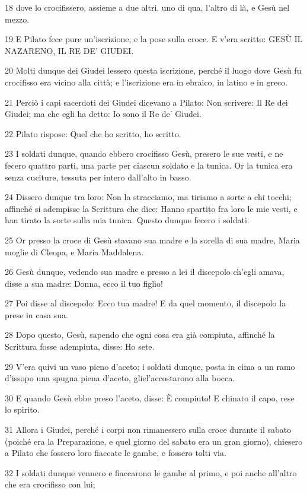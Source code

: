 \par 18 dove lo crocifissero, assieme a due altri, uno di qua, l'altro di là, e Gesù nel mezzo.
\par 19 E Pilato fece pure un'iscrizione, e la pose sulla croce. E v'era scritto: GESÙ IL NAZARENO, IL RE DE' GIUDEI.
\par 20 Molti dunque dei Giudei lessero questa iscrizione, perché il luogo dove Gesù fu crocifisso era vicino alla città; e l'iscrizione era in ebraico, in latino e in greco.
\par 21 Perciò i capi sacerdoti dei Giudei dicevano a Pilato: Non scrivere: Il Re dei Giudei; ma che egli ha detto: Io sono il Re de' Giudei.
\par 22 Pilato rispose: Quel che ho scritto, ho scritto.
\par 23 I soldati dunque, quando ebbero crocifisso Gesù, presero le sue vesti, e ne fecero quattro parti, una parte per ciascun soldato e la tunica. Or la tunica era senza cuciture, tessuta per intero dall'alto in basso.
\par 24 Dissero dunque tra loro: Non la stracciamo, ma tiriamo a sorte a chi tocchi; affinché si adempisse la Scrittura che dice: Hanno spartito fra loro le mie vesti, e han tirato la sorte sulla mia tunica. Questo dunque fecero i soldati.
\par 25 Or presso la croce di Gesù stavano sua madre e la sorella di sua madre, Maria moglie di Cleopa, e Maria Maddalena.
\par 26 Gesù dunque, vedendo sua madre e presso a lei il discepolo ch'egli amava, disse a sua madre: Donna, ecco il tuo figlio!
\par 27 Poi disse al discepolo: Ecco tua madre! E da quel momento, il discepolo la prese in casa sua.
\par 28 Dopo questo, Gesù, sapendo che ogni cosa era già compiuta, affinché la Scrittura fosse adempiuta, disse: Ho sete.
\par 29 V'era quivi un vaso pieno d'aceto; i soldati dunque, posta in cima a un ramo d'issopo una spugna piena d'aceto, gliel'accostarono alla bocca.
\par 30 E quando Gesù ebbe preso l'aceto, disse: È compiuto! E chinato il capo, rese lo spirito.
\par 31 Allora i Giudei, perché i corpi non rimanessero sulla croce durante il sabato (poiché era la Preparazione, e quel giorno del sabato era un gran giorno), chiesero a Pilato che fossero loro fiaccate le gambe, e fossero tolti via.
\par 32 I soldati dunque vennero e fiaccarono le gambe al primo, e poi anche all'altro che era crocifisso con lui;
